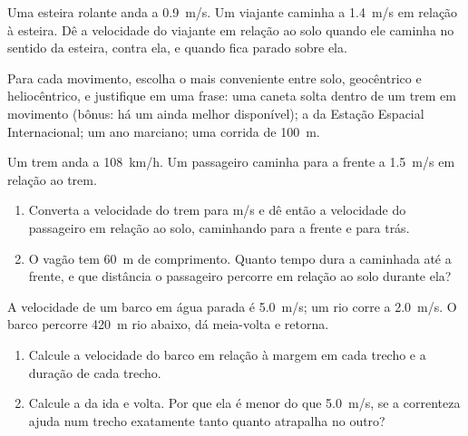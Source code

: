 \begin{exercise}[$\star$]\label{exo:g10:relative-motion:4}
Uma esteira rolante anda a \qty{0.9}{m/s}. Um viajante caminha a
\qty{1.4}{m/s} em relação à esteira. Dê a velocidade do viajante em
relação ao solo quando ele caminha no sentido da esteira, contra ela, e
quando fica parado sobre ela.
\end{exercise}

\begin{exercise}[$\star$]\label{exo:g10:relative-motion:5}
Para cada movimento, escolha o  mais conveniente entre solo,
geocêntrico e heliocêntrico, e justifique em uma frase: uma caneta solta
dentro de um trem em movimento (bônus: há um  ainda melhor
disponível); a  da Estação Espacial Internacional; um ano marciano;
uma corrida de \qty{100}{m}.
\end{exercise}

\begin{exercise}[$\star\star$]\label{exo:g10:relative-motion:6}
Um trem anda a \qty{108}{km/h}. Um passageiro caminha para a frente a
\qty{1.5}{m/s} em relação ao trem.
\begin{enumerate}
  \item Converta a velocidade do trem para \unit{m/s} e dê então a
        velocidade do passageiro em relação ao solo, caminhando para a
        frente e para trás.
  \item O vagão tem \qty{60}{m} de comprimento. Quanto tempo dura a
        caminhada até a frente, e que distância o passageiro percorre em
        relação ao solo durante ela?
\end{enumerate}
\end{exercise}

\begin{exercise}[$\star\star$]\label{exo:g10:relative-motion:7}
A velocidade de um barco em água parada é \qty{5.0}{m/s}; um rio corre a
\qty{2.0}{m/s}. O barco percorre \qty{420}{m} rio abaixo, dá meia-volta e
retorna.
\begin{enumerate}
  \item Calcule a velocidade do barco em relação à margem em cada trecho
        e a duração de cada trecho.
  \item Calcule a  da ida e volta. Por que ela é menor do
        que \qty{5.0}{m/s}, se a correnteza ajuda num trecho exatamente
        tanto quanto atrapalha no outro?
\end{enumerate}
\end{exercise}

